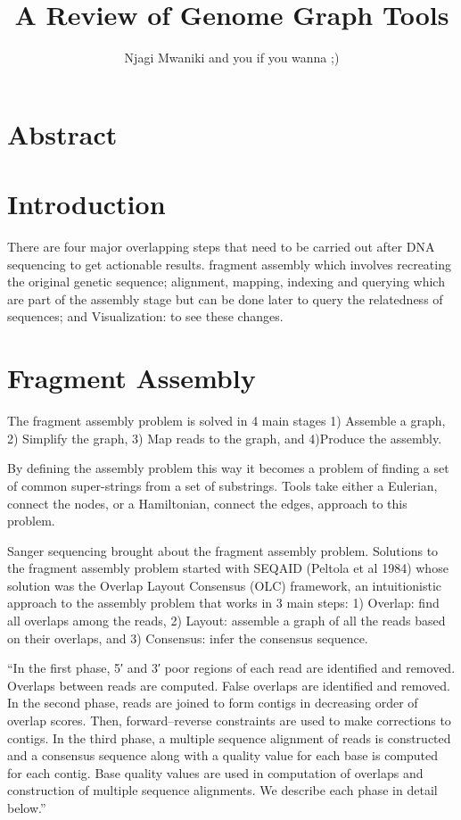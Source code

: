 \documentclass[11pt]{article}
\author{Njagi Mwaniki and you if you wanna ;)}
\date{}
\title{A Review of Genome Graph Tools}
\begin{document}
\maketitle

\section{Abstract}
\label{sec:org9e67f3a}

\section{Introduction}
\label{sec:orgcf5dca6}

There are four major overlapping steps that need to be carried out after DNA sequencing to get actionable results. 
fragment assembly which involves recreating the original genetic sequence;
alignment, mapping, indexing and querying which are part of the 
assembly stage but can be done later to query the relatedness of sequences;
and Visualization: to see these changes.

\section{Fragment Assembly}
\label{sec:org0051fa5}
The fragment assembly problem is solved in 4 main stages 1) Assemble a graph, 2)
Simplify the graph, 3) Map reads to the graph, and 4)Produce the assembly.

By defining the assembly problem this way it becomes a problem of finding a set
of common super-strings from a set of substrings.
Tools take either a Eulerian, connect the nodes, or a Hamiltonian, connect the 
edges, approach to this problem.

Sanger sequencing brought about the fragment assembly problem. 
Solutions to the fragment assembly problem started with SEQAID 
(Peltola et al 1984) whose solution was the Overlap Layout Consensus (OLC) 
framework, an intuitionistic approach to the assembly problem that works in 
3 main steps: 1) Overlap: find all overlaps among the reads, 2) Layout: assemble 
a graph of all the reads based on their overlaps, and 3) Consensus: infer the 
consensus sequence.

“In the first phase, 5′ and 3′ poor regions of each read are identified and removed. 
Overlaps between reads are computed. False overlaps are identified and removed. 
In the second phase, reads are joined to form contigs in decreasing order of overlap scores.
 Then, forward–reverse constraints are used to make corrections to contigs. 
In the third phase, a multiple sequence alignment of reads is constructed and a
 consensus sequence along with a quality value for each base is computed for 
each contig. Base quality values are used in computation of overlaps and
 construction of multiple sequence alignments. We describe each phase in
 detail below.”
\end{document}
